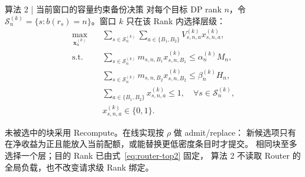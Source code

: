 \begin{frame}{算法 2 | 当前窗口的容量约束备份决策}
  \small
  对每个目标 DP rank $n$，令
  $\mathcal S_n^{(k)}=\{s:b(r_s)=n\}$。窗口 $k$ 只在该 Rank 内选择层级：
  \begin{equation}
    \begin{aligned}
      \max_{\mathbf x_n^{(k)}}\quad
        &\sum_{s\in\mathcal S_n^{(k)}}\sum_{a\in\{B_1,B_2\}}
          V_{s,n,a}^{(k)}x_{s,n,a}^{(k)},\\
      \text{s.t.}\quad
        &\sum_{s\in\mathcal S_n^{(k)}}m_{s,n,B_1}x_{s,n,B_1}^{(k)}
          \le\alpha_n^{(k)}M_n,\\
        &\sum_{s\in\mathcal S_n^{(k)}}m_{s,n,B_2}x_{s,n,B_2}^{(k)}
          \le\beta_n^{(k)}H_n,\\
        &\sum_{a\in\{B_1,B_2\}}x_{s,n,a}^{(k)}\le1,
          \quad\forall s\in\mathcal S_n^{(k)},\\
        &x_{s,n,a}^{(k)}\in\{0,1\}.
    \end{aligned}
    \label{eq:backup-placement}
  \end{equation}

  \scriptsize
  未被选中的块采用 Recompute。在线实现按 $\rho$ 做 admit/replace：
  新候选项只有在净收益为正且能放入当前配额，或能替换更低密度条目时才提交。
  相同块至多选择一个层；目的 Rank 已由式~\eqref{eq:router-top2} 固定，
  算法 2 不读取 Router 的全局负载，也不改变请求级 Rank 绑定。

  \vspace{0.06cm}
\end{frame}


